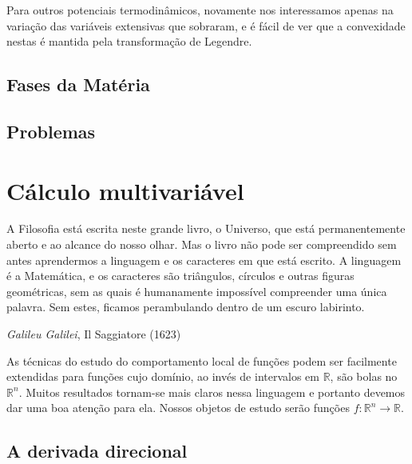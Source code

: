 \documentclass[a4paper, 12pt]{article}
\theoremstyle{definition}
\theoremstyle{definition}
\begin{document}
Para outros potenciais termodinâmicos, novamente nos interessamos apenas na variação das variáveis extensivas
que sobraram, e é fácil de ver que a convexidade nestas é mantida pela transformação de Legendre.

\subsection{Fases da Matéria}

\subsection{Problemas}

\appendix

\section{Cálculo multivariável}

\epigraph{\justifying A Filosofia está escrita neste grande livro, o Universo, que está permanentemente 
aberto e ao alcance do nosso olhar. Mas o livro não pode ser compreendido sem antes aprendermos
a linguagem e os caracteres em que está escrito. A linguagem é a Matemática, e os caracteres são triângulos, 
círculos e outras figuras geométricas, sem as quais é humanamente impossível compreender uma única palavra.
Sem estes, ficamos perambulando dentro de um escuro labirinto.}
{\textit{Galileu Galilei}, Il Saggiatore (1623)}

As técnicas do estudo do comportamento local de funções podem ser facilmente extendidas para funções cujo
domínio, ao invés de intervalos em $\mathbb R$, são bolas no $\mathbb R^n$. Muitos resultados tornam-se 
mais claros nessa linguagem e portanto devemos dar uma boa atenção para ela. Nossos objetos de estudo serão
funções $f:\mathbb R^n\rightarrow\mathbb R$.

\subsection{A derivada direcional}
\end{document}
